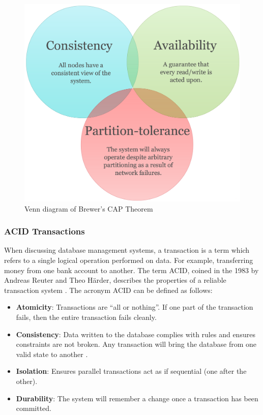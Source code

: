 \begin{figure}[h]\begin{center}\includegraphics[width=1\linewidth]{images/venncap}\caption{Venn diagram of Brewer's CAP Theorem}\label{fig:venncap}\end{center}\end{figure}

\subsubsection{ACID Transactions}\label{acid}
When discussing database management systems, a transaction is a term which refers to a single logical operation performed on data. For example, transferring money from one bank account to another. The term ACID, coined in the 1983 by Andreas Reuter and Theo Härder, describes the properties of a reliable transaction system \cite{acid}. The acronym ACID can be defined as follows:

\begin{itemize}
\item \textbf{Atomicity}: Transactions are ``all or nothing''. If one part of the transaction fails, then the entire transaction fails cleanly.
\item \textbf{Consistency}: Data written to the database complies with rules and ensures constraints are not broken. Any transaction will bring the database from one valid state to another \cite{acidtrans}.
\item \textbf{Isolation}: Ensures parallel transactions act as if sequential (one after the other).
\item \textbf{Durability}: The system will remember a change once a transaction has been committed.
\end{itemize}

